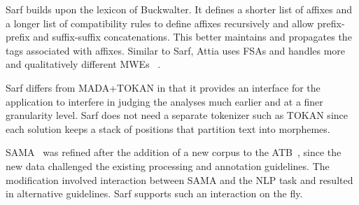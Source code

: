 \documentclass[11pt]{article}
\begin{document}
Sarf builds upon the lexicon of Buckwalter. %
It defines a shorter list of affixes
and a longer list of 
compatibility rules to define 
affixes recursively and allow 
prefix-prefix and suffix-suffix 
concatenations.
This better maintains and propagates 
the tags associated with affixes. 
Similar to Sarf, Attia uses FSAs and handles more and qualitatively different MWEs
~\cite{Attia:06,Attia:10}.

Sarf differs from MADA+TOKAN in that it provides an interface for the 
application to interfere in judging the analyses much earlier and
at a finer granularity level. 
Sarf does not need a separate tokenizer such as
TOKAN since each solution keeps a stack of positions
that partition text into morphemes.



SAMA~\cite{Maamouri:10} was refined after the addition of a new corpus to 
the ATB~\cite{Maamouri:04}, since the new data challenged the existing processing and 
annotation guidelines.
The modification involved interaction between SAMA and the NLP 
task and resulted in alternative guidelines. 
Sarf supports such an interaction on the fly.

\end{document}
